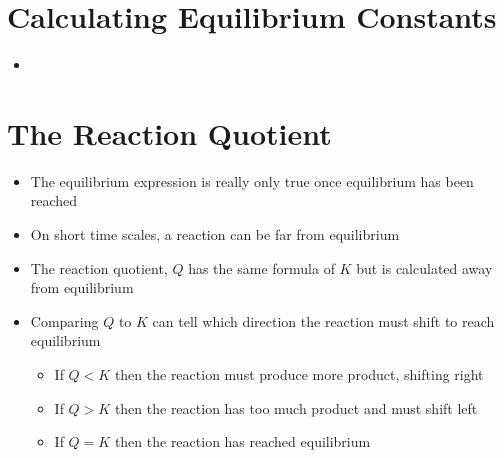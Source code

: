 \documentclass[12pt, openany, letterpaper]{memoir}
\begin{document}
\section{Calculating Equilibrium Constants}
\begin{itemize}
  \item ~
\end{itemize}

\section{The Reaction Quotient}
\begin{itemize}
	\item The equilibrium expression is really only true once equilibrium has been reached
	\item On short time scales, a reaction can be far from equilibrium
	\item The reaction quotient, $Q$ has the same formula of $K$ but is calculated away from equilibrium
	\item Comparing $Q$ to $K$ can tell which direction the reaction must shift to reach equilibrium
	\begin{itemize}
		\item If $Q<K$ then the reaction must produce more product, shifting right
		\item If $Q>K$ then the reaction has too much product and must shift left
		\item If $Q=K$ then the reaction has reached equilibrium
	\end{itemize}
\end{itemize}
\end{document}
